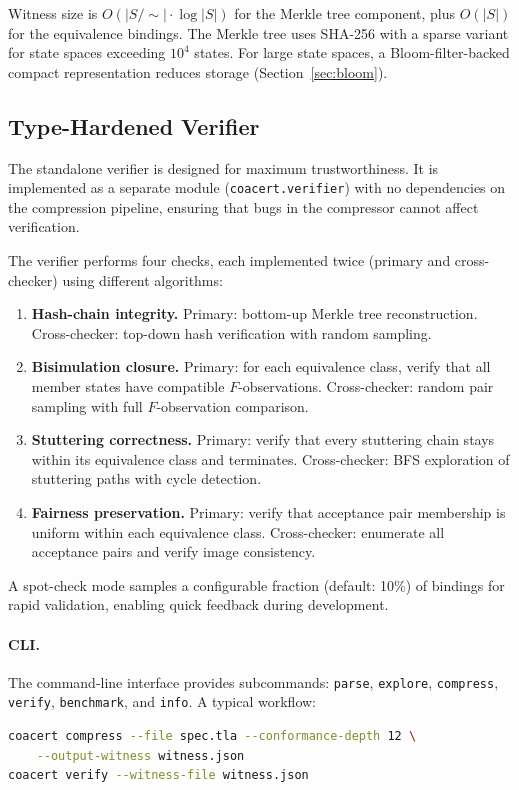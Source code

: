\documentclass[11pt]{article}
\begin{document}
Witness size is $O(|S/{\sim}| \cdot \log |S|)$ for the Merkle tree
component, plus $O(|S|)$ for the equivalence bindings.
The Merkle tree uses SHA-256 with a sparse variant for state spaces
exceeding $10^4$ states.
For large state spaces, a Bloom-filter-backed compact representation
reduces storage (Section~\ref{sec:bloom}).

\subsection{Type-Hardened Verifier}

The standalone verifier is designed for maximum trustworthiness.
It is implemented as a separate module (\texttt{coacert.verifier}) with
no dependencies on the compression pipeline, ensuring that bugs in the
compressor cannot affect verification.

The verifier performs four checks, each implemented twice (primary and
cross-checker) using different algorithms:

\begin{enumerate}[nosep]
\item \textbf{Hash-chain integrity.}
  Primary: bottom-up Merkle tree reconstruction.
  Cross-checker: top-down hash verification with random sampling.

\item \textbf{Bisimulation closure.}
  Primary: for each equivalence class, verify that all member states have
  compatible $F$-observations.
  Cross-checker: random pair sampling with full $F$-observation comparison.

\item \textbf{Stuttering correctness.}
  Primary: verify that every stuttering chain stays within its equivalence
  class and terminates.
  Cross-checker: BFS exploration of stuttering paths with cycle detection.

\item \textbf{Fairness preservation.}
  Primary: verify that acceptance pair membership is uniform within each
  equivalence class.
  Cross-checker: enumerate all acceptance pairs and verify image consistency.
\end{enumerate}

A spot-check mode samples a configurable fraction (default: 10\%) of
bindings for rapid validation, enabling quick feedback during development.

\paragraph{CLI.}
The command-line interface provides subcommands: \texttt{parse},
\texttt{explore}, \texttt{compress}, \texttt{verify}, \texttt{benchmark},
and \texttt{info}.
A typical workflow:
\begin{lstlisting}[language=bash]
coacert compress --file spec.tla --conformance-depth 12 \
    --output-witness witness.json
coacert verify --witness-file witness.json
\end{lstlisting}
\end{document}
